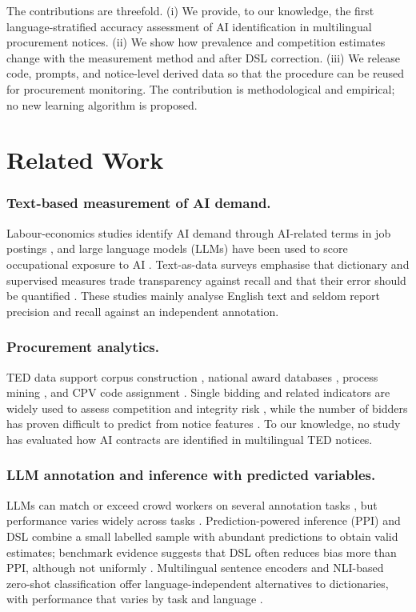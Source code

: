 The contributions are threefold. (i) We provide, to our knowledge, the first language-stratified accuracy assessment of AI identification in multilingual procurement notices. (ii) We show how prevalence and competition estimates change with the measurement method and after DSL correction. (iii) We release code, prompts, and notice-level derived data so that the procedure can be reused for procurement monitoring. The contribution is methodological and empirical; no new learning algorithm is proposed.

\section{Related Work}
\subsubsection{Text-based measurement of AI demand.} Labour-economics studies identify AI demand through AI-related terms in job postings \cite{acemoglu2022,babina2024}, and large language models (LLMs) have been used to score occupational exposure to AI \cite{eloundou2024}. Text-as-data surveys emphasise that dictionary and supervised measures trade transparency against recall and that their error should be quantified \cite{gentzkow2019}. These studies mainly analyse English text and seldom report precision and recall against an independent annotation.

\subsubsection{Procurement analytics.} TED data support corpus construction \cite{ahmia2018}, national award databases \cite{potin2023}, process mining \cite{nai2023}, and CPV code assignment \cite{siciliani2023}. Single bidding and related indicators are widely used to assess competition and integrity risk \cite{fazekas2016,decarolis2022}, while the number of bidders has proven difficult to predict from notice features \cite{lozamencia2013}. To our knowledge, no study has evaluated how AI contracts are identified in multilingual TED notices.

\subsubsection{LLM annotation and inference with predicted variables.} LLMs can match or exceed crowd workers on several annotation tasks \cite{gilardi2023,tornberg2023}, but performance varies widely across tasks \cite{ziems2024}. Prediction-powered inference (PPI) \cite{angelopoulos2023} and DSL \cite{egami2023} combine a small labelled sample with abundant predictions to obtain valid estimates; benchmark evidence suggests that DSL often reduces bias more than PPI, although not uniformly \cite{audinet2025}. Multilingual sentence encoders \cite{wang2024me5,reimers2020} and NLI-based zero-shot classification \cite{yin2019,he2023} offer language-independent alternatives to dictionaries, with performance that varies by task and language \cite{muennighoff2023,conneau2020}.
